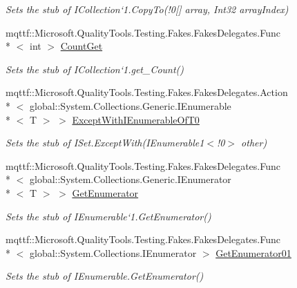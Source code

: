 \begin{DoxyCompactItemize}
\begin{DoxyCompactList}\small\item\em Sets the stub of I\-Collection`1.Copy\-To(!0\mbox{[}\mbox{]} array, Int32 array\-Index)\end{DoxyCompactList}\item 
mqttf\-::\-Microsoft.\-Quality\-Tools.\-Testing.\-Fakes.\-Fakes\-Delegates.\-Func\\*
$<$ int $>$ \hyperlink{class_system_1_1_collections_1_1_generic_1_1_fakes_1_1_stub_i_set_3_01_t_01_4_a2e2c3aa4427d982cb70e2567b2f63c10}{Count\-Get}
\begin{DoxyCompactList}\small\item\em Sets the stub of I\-Collection`1.get\-\_\-\-Count()\end{DoxyCompactList}\item 
mqttf\-::\-Microsoft.\-Quality\-Tools.\-Testing.\-Fakes.\-Fakes\-Delegates.\-Action\\*
$<$ global\-::\-System.\-Collections.\-Generic.\-I\-Enumerable\\*
$<$ T $>$ $>$ \hyperlink{class_system_1_1_collections_1_1_generic_1_1_fakes_1_1_stub_i_set_3_01_t_01_4_a0e8de6748c9c9bd4959a514322c5c7e8}{Except\-With\-I\-Enumerable\-Of\-T0}
\begin{DoxyCompactList}\small\item\em Sets the stub of I\-Set{.\-Except\-With(I\-Enumerable}1$<$!0$>$ other)\end{DoxyCompactList}\item 
mqttf\-::\-Microsoft.\-Quality\-Tools.\-Testing.\-Fakes.\-Fakes\-Delegates.\-Func\\*
$<$ global\-::\-System.\-Collections.\-Generic.\-I\-Enumerator\\*
$<$ T $>$ $>$ \hyperlink{class_system_1_1_collections_1_1_generic_1_1_fakes_1_1_stub_i_set_3_01_t_01_4_a6d13949159719640da31f7e1a8c9f2d8}{Get\-Enumerator}
\begin{DoxyCompactList}\small\item\em Sets the stub of I\-Enumerable`1.Get\-Enumerator()\end{DoxyCompactList}\item 
mqttf\-::\-Microsoft.\-Quality\-Tools.\-Testing.\-Fakes.\-Fakes\-Delegates.\-Func\\*
$<$ global\-::\-System.\-Collections.\-I\-Enumerator $>$ \hyperlink{class_system_1_1_collections_1_1_generic_1_1_fakes_1_1_stub_i_set_3_01_t_01_4_a1e0b8a49106b78c804080a26bb61c9ab}{Get\-Enumerator01}
\begin{DoxyCompactList}\small\item\em Sets the stub of I\-Enumerable.\-Get\-Enumerator()\end{DoxyCompactList}\item 

\end{DoxyCompactItemize}
